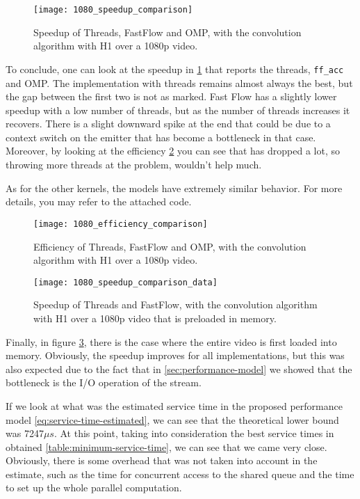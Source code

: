 \begin{figure}[!htp]
    \centering
    \texttt{[image: 1080\_speedup\_comparison]}
    \caption{Speedup of Threads, FastFlow and OMP, with the convolution algorithm with H1 over a 1080p video.}
    \label{fig:1080-speedup-stream-comparison}
\end{figure}
To conclude, one can look at the speedup in \cref{fig:1080-speedup-stream-comparison} that reports the threads, \texttt{ff_acc} and OMP. The implementation with threads remains almost always the best, but the gap between the first two is not as marked. Fast Flow has a slightly lower speedup with a low number of threads, but as the number of threads increases it recovers. There is a slight downward spike at the end that could be due to a context switch on the emitter that has become a bottleneck in that case. Moreover, by looking at the efficiency \cref{fig:1080-efficiency-stream-comparison} you can see that has dropped a lot, so throwing more threads at the problem, wouldn't help much.

As for the other kernels, the models have extremely similar behavior. For more details, you may refer to the attached code.

\begin{figure}[!htp]
    \centering
    \texttt{[image: 1080\_efficiency\_comparison]}
    \caption{Efficiency of Threads, FastFlow and OMP, with the convolution algorithm with H1 over a 1080p video.}
    \label{fig:1080-efficiency-stream-comparison}
\end{figure}

\begin{figure}[!htp]
    \centering
    \texttt{[image: 1080\_speedup\_comparison\_data]}
    \caption{Speedup of Threads and FastFlow, with the convolution algorithm with H1 over a 1080p video that is preloaded in memory.}
    \label{fig:1080-speedup-data-comparison}
\end{figure}
Finally, in figure \cref{fig:1080-speedup-data-comparison}, there is the case where the entire video is first loaded into memory. Obviously, the speedup improves for all implementations, but this was also expected due to the fact that in \cref{sec:performance-model} we showed that the bottleneck is the I/O operation of the stream.

If we look at what was the estimated service time in the proposed performance model \cref{eq:service-time-estimated}, we can see that the theoretical lower bound was 7247$\mu s$. At this point, taking into consideration the best service times in obtained \cref{table:minimum-service-time}, we can see that we came very close. Obviously, there is some overhead that was not taken into account in the estimate, such as the time for concurrent access to the shared queue and the time to set up the whole parallel computation. 

